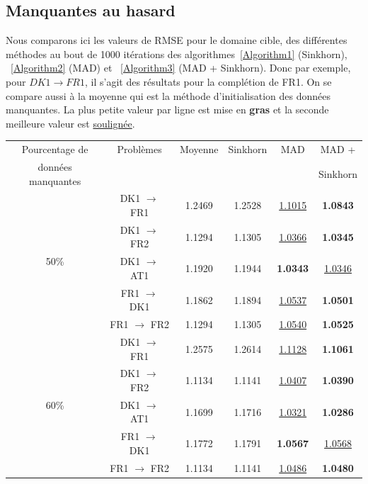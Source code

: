 \documentclass[acmsmall, natbib=false, nonacm]{acmart}
\begin{document}
\subsection{Manquantes au hasard}
Nous comparons ici les valeurs de RMSE pour le domaine cible, des différentes méthodes au bout de 1000 itérations des algorithmes~\ref{Algorithm1} (Sinkhorn), ~\ref{Algorithm2} (MAD) et ~\ref{Algorithm3} (MAD + Sinkhorn).
Donc par exemple, pour $DK1 \rightarrow FR1$, il s'agit des résultats pour la complétion de FR1.
On se compare aussi à la moyenne qui est la méthode d'initialisation des données manquantes.
La plus petite valeur par ligne est mise en \textbf{gras} et la seconde meilleure valeur est \underline{soulignée}.
\begin{table}[H]
    \begin{tabular}{| c | c | c | c | c | c |}
        \hline
        Pourcentage de & Problèmes & Moyenne & Sinkhorn & MAD & MAD + \\
        données manquantes &  &  &  &  & Sinkhorn \\[0.5ex]
        \hline\hline
        \multirow{5}{4em}{50\%} & DK1 $\rightarrow$ FR1 & 1.2469 & 1.2528 & \underline{1.1015} & \textbf{1.0843} \\
                                & DK1 $\rightarrow$ FR2 & 1.1294 & 1.1305 & \underline{1.0366} & \textbf{1.0345} \\
                                & DK1 $\rightarrow$ AT1 & 1.1920 & 1.1944 & \textbf{1.0343} & \underline{1.0346} \\
                                & FR1 $\rightarrow$ DK1 & 1.1862 & 1.1894 & \underline{1.0537} & \textbf{1.0501} \\
                                & FR1 $\rightarrow$ FR2 & 1.1294 & 1.1305 & \underline{1.0540} & \textbf{1.0525} \\
        \hline  
        \multirow{5}{4em}{60\%} & DK1 $\rightarrow$ FR1 & 1.2575 & 1.2614 & \underline{1.1128} & \textbf{1.1061} \\
                                & DK1 $\rightarrow$ FR2 & 1.1134 & 1.1141 & \underline{1.0407} & \textbf{1.0390} \\
                                & DK1 $\rightarrow$ AT1 & 1.1699 & 1.1716 & \underline{1.0321} & \textbf{1.0286} \\
                                & FR1 $\rightarrow$ DK1 & 1.1772 & 1.1791 & \textbf{1.0567} & \underline{1.0568} \\
                                & FR1 $\rightarrow$ FR2 & 1.1134 & 1.1141 & \underline{1.0486} & \textbf{1.0480} \\

\end{tabular}
\end{table}
\end{document}
